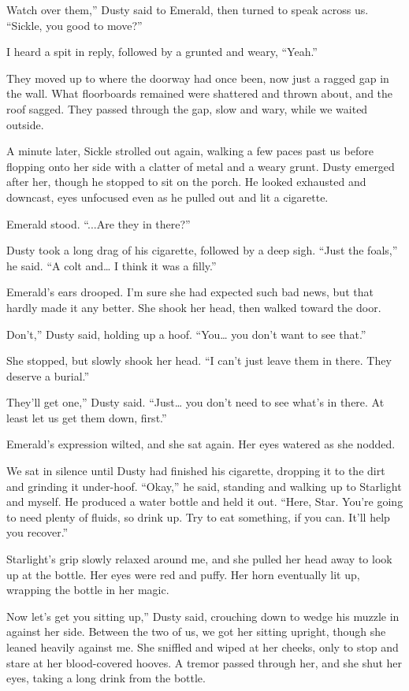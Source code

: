 \leavevmode{}Watch over them,” Dusty said to Emerald, then turned to speak across us. “Sickle, you good to move?”

I heard a spit in reply, followed by a grunted and weary, “Yeah.”

They moved up to where the doorway had once been, now just a ragged gap in the wall. What floorboards remained were shattered and thrown about, and the roof sagged. They passed through the gap, slow and wary, while we waited outside.

A minute later, Sickle strolled out again, walking a few paces past us before flopping onto her side with a clatter of metal and a weary grunt. Dusty emerged after her, though he stopped to sit on the porch. He looked exhausted and downcast, eyes unfocused even as he pulled out and lit a cigarette.

Emerald stood. “...Are they in there?”

Dusty took a long drag of his cigarette, followed by a deep sigh. “Just the foals,” he said. “A colt and… I think it was a filly.”

Emerald’s ears drooped. I’m sure she had expected such bad news, but that hardly made it any better. She shook her head, then walked toward the door.

\leavevmode{}Don’t,” Dusty said, holding up a hoof. “You… you don’t want to see that.”

She stopped, but slowly shook her head. “I can’t just leave them in there. They deserve a burial.”

\leavevmode{}They’ll get one,” Dusty said. “Just… you don’t need to see what’s in there. At least let us get them down, first.”

Emerald’s expression wilted, and she sat again. Her eyes watered as she nodded.

We sat in silence until Dusty had finished his cigarette, dropping it to the dirt and grinding it under-hoof. “Okay,” he said, standing and walking up to Starlight and myself. He produced a water bottle and held it out. “Here, Star. You’re going to need plenty of fluids, so drink up. Try to eat something, if you can. It’ll help you recover.”

Starlight’s grip slowly relaxed around me, and she pulled her head away to look up at the bottle. Her eyes were red and puffy. Her horn eventually lit up, wrapping the bottle in her magic.

\leavevmode{}Now let’s get you sitting up,” Dusty said, crouching down to wedge his muzzle in against her side. Between the two of us, we got her sitting upright, though she leaned heavily against me. She sniffled and wiped at her cheeks, only to stop and stare at her blood-covered hooves. A tremor passed through her, and she shut her eyes, taking a long drink from the bottle.

